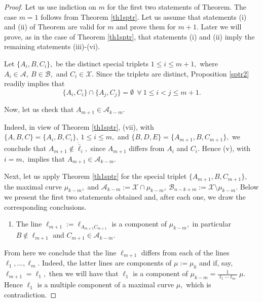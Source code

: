 \documentclass[a4paper,12pt]{article}
\theoremstyle{definition}
\numberwithin{equation}{section}
\numberwithin{figure}{section}
\newcommand{\Aset}{\mathcal{A}}
\newcommand{\Bset}{\mathcal{B}}
\newcommand{\Xset}{\mathcal{X}}
\begin{document}
\begin{proof}
Let us use indiction on $m$ for the first two statements of Theorem.
The case $m=1$ follows from Theorem \ref{th1sptr}.
Let us assume that statements (i) and (ii) of Theorem are valid for $m$ and prove them for $m+1.$
Later we will prove, as in the case of Theorem \ref{th1sptr}, that statements (i) and (ii) imply the remaining statements (iii)-(vi). 

Let $\{A_i,B,C_i\},$ be the distinct special triplets $1\le i\le m+1,$ where $A_i \in \Aset,\ B\in \Bset,$ and  $C_i \in \Xset.$ 
Since the triplets are distinct, Proposition \ref{sptr2} readily implies that 
\begin{equation*}\label{ACij}\{A_i,C_i\}\cap \{A_j,C_j\}=\emptyset\ \ \forall\ 1\le i<j\le m+1.\end{equation*}

Now, let us check that $A_{m+1}\in \Aset_{k-m}.$

Indeed, in view of  Theorem \ref{th1sptr}, (vii), with $\{A,B,C\}=\{A_i,B,C_i\},\ 1\le i\le m,$ and $\{B,D,E\}=\{A_{m+1},B,C_{m+1}\},$ we conclude that $A_{m+1}\notin \dot{\bar\ell}_i,$ since $A_{m+1}$ differs from $A_i$ and $C_i.$  Hence (v), with $i=m,$ implies that $A_{m+1}\in\Aset_{k-m}.$  


Next, let us apply Theorem \ref{th1sptr} for the special triplet $\{A_{m+1},B,C_{m+1}\},$   the maximal curve $\mu_{k-m},$ and $\Aset_{k-m}:=\Xset\cap\mu_{k-m},\ \Bset_{n-k+m}:=\Xset\setminus\mu_{k-m}.$
Below we present the first two statements obtained and, after each one, we draw the corresponding conclusions.
\begin{enumerate}[label*=\arabic*.]
\setcounter{enumi}{0}
\setlength{\itemsep}{0mm}
\item
The line $\ell_{m+1}:=\ell_{A_{m+1}C_{m+1}}$ is a component of $\mu_{k-m},$ in particular $B\notin\ell_{m+1}$ and $C_{m+1}\in \Aset_{k-m}.$ 
\end{enumerate}
From here we conclude that the line $\ell_{m+1}$ differs from each of the lines
$\ell_1, \ldots,\ell_m.$ Indeed, the latter lines are components of $\mu:=\mu_k$ and if, say, $\ell_{m+1}=\ell_1,$ then we will have that $\ell_1$ is a component of $\mu_{k-m}=\frac{1}{\ell_1\cdots\ell_m}\ \mu.$ Hence $\ell_1$ is a multiple component of a maximal curve $\mu,$ which is contradiction.


\end{proof}
\end{document}

